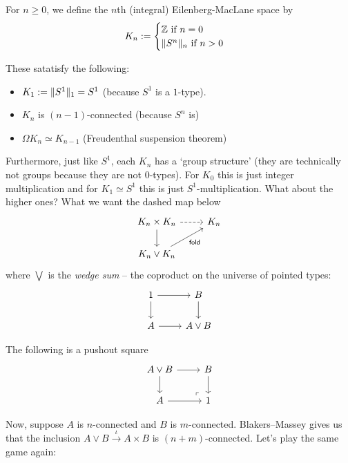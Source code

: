\documentclass[10pt,oneside,leqno,openright]{memoir}
\begin{document}
\begin{definition}
  For $n \geq 0$, we define the $n$th (integral) Eilenberg-MacLane space by
  \[K_n := \begin{cases} \mathbb{Z} \text{ if $n=0$} \\ \lVert S^n\rVert_n \text{ if $n>0$} \end{cases}  \]
\end{definition}
These satatisfy the following:
\begin{itemize}
\item $K_1 := \lVert S^1\rVert_1 = S^1$ (because $S^1$ is a $1$-type).
\item $K_n$ is $(n-1)$-connected (because $S^n$ is)
\item $\Omega K_n \simeq K_{n-1}$ (Freudenthal suspension theorem)
\end{itemize}
Furthermore, just like $S^1$, each $K_n$ has a `group structure' (they are technically not groups because they are not $0$-types). For $K_0$ this is just integer multiplication and for $K_1 \simeq S^1$ this is just $S^1$-multiplication. What about the higher ones? What we want the dashed map below
\[\begin{tikzcd}[ampersand replacement=\&]
	{K_n \times K_n} \& {K_n} \\
	{K_n \vee K_n}
	\arrow[dashed, from=1-1, to=1-2]
	\arrow[from=1-1, to=2-1]
	\arrow["{\mathsf{fold}}"', from=2-1, to=1-2]
\end{tikzcd}\]
where $\bigvee$ is the \emph{wedge sum} -- the coproduct on the universe of pointed types:
\[\begin{tikzcd}[ampersand replacement=\&]
	1 \& B \\
	A \& {A \vee B}
	\arrow[from=1-1, to=1-2]
	\arrow[from=1-1, to=2-1]
	\arrow[from=1-2, to=2-2]
	\arrow[from=2-1, to=2-2]
\end{tikzcd}\]

\begin{lemma}
  The following is a pushout square
\[\begin{tikzcd}[ampersand replacement=\&]
	{A \vee B} \& B \\
	A \& 1
	\arrow[from=1-1, to=1-2]
	\arrow[from=1-1, to=2-1]
	\arrow[from=1-2, to=2-2]
	\arrow[from=2-1, to=2-2]
	\arrow["\lrcorner"{anchor=center, pos=0.125, rotate=180}, draw=none, from=2-2, to=1-1]
\end{tikzcd}\]
\end{lemma}

Now, suppose $A$ is $n$-connected and $B$ is $m$-connected. Blakers--Massey gives us that the inclusion $A \vee B \xrightarrow{\iota} A \times B$ is $(n+m)$-connected.
%
Let's play the same game again:
\end{document}

